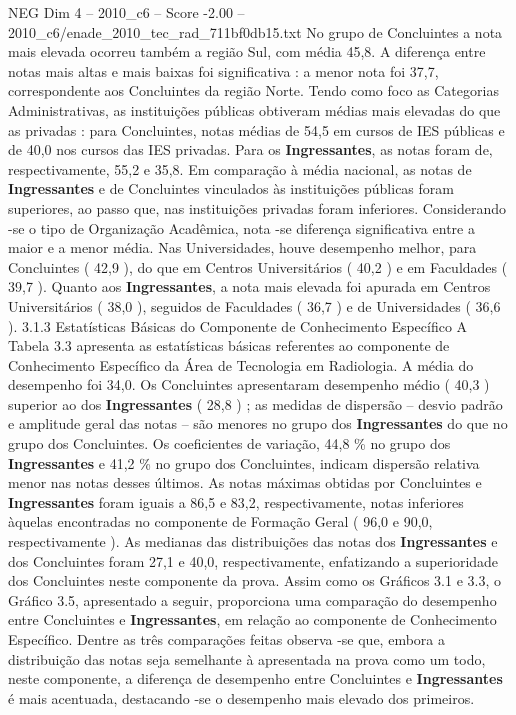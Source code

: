\begin{textsample}{NEG Dim 4 – 2010\_c6 – Score -2.00 – 2010\_c6/enade\_2010\_tec\_rad\_711bf0db15.txt}
No grupo de Concluintes a nota mais elevada ocorreu também a região Sul, com média 45,8.
A diferença entre notas mais altas e mais baixas foi significativa : a menor nota foi 37,7, correspondente aos Concluintes da região Norte.
Tendo como foco as Categorias Administrativas, as instituições públicas obtiveram médias mais elevadas do que as privadas : para Concluintes, notas médias de 54,5 em cursos de IES públicas e de 40,0 nos cursos das IES privadas.
Para os \textbf{Ingressantes}, as notas foram de, respectivamente, 55,2 e 35,8.
Em comparação à média nacional, as notas de \textbf{Ingressantes} e de Concluintes vinculados às instituições públicas foram superiores, ao passo que, nas instituições privadas foram inferiores.
Considerando -se o tipo de Organização Acadêmica, nota -se diferença significativa entre a maior e a menor média.
Nas Universidades, houve desempenho melhor, para Concluintes ( 42,9 ), do que em Centros Universitários ( 40,2 ) e em Faculdades ( 39,7 ).
Quanto aos \textbf{Ingressantes}, a nota mais elevada foi apurada em Centros Universitários ( 38,0 ), seguidos de Faculdades ( 36,7 ) e de Universidades ( 36,6 ). 3.1.3 Estatísticas Básicas do Componente de Conhecimento Específico A Tabela 3.3 apresenta as estatísticas básicas referentes ao componente de Conhecimento Específico da Área de Tecnologia em Radiologia.
A média do desempenho foi 34,0.
Os Concluintes apresentaram desempenho médio ( 40,3 ) superior ao dos \textbf{Ingressantes} ( 28,8 ) ; as medidas de dispersão – desvio padrão e amplitude geral das notas – são menores no grupo dos \textbf{Ingressantes} do que no grupo dos Concluintes.
Os coeficientes de variação, 44,8 \% no grupo dos \textbf{Ingressantes} e 41,2 \% no grupo dos Concluintes, indicam dispersão relativa menor nas notas desses últimos.
As notas máximas obtidas por Concluintes e \textbf{Ingressantes} foram iguais a 86,5 e 83,2, respectivamente, notas inferiores àquelas encontradas no componente de Formação Geral ( 96,0 e 90,0, respectivamente ).
As medianas das distribuições das notas dos \textbf{Ingressantes} e dos Concluintes foram 27,1 e 40,0, respectivamente, enfatizando a superioridade dos Concluintes neste componente da prova.
Assim como os Gráficos 3.1 e 3.3, o Gráfico 3.5, apresentado a seguir, proporciona uma comparação do desempenho entre Concluintes e \textbf{Ingressantes}, em relação ao componente de Conhecimento Específico.
Dentre as três comparações feitas observa -se que, embora a distribuição das notas seja semelhante à apresentada na prova como um todo, neste componente, a diferença de desempenho entre Concluintes e \textbf{Ingressantes} é mais acentuada, destacando -se o desempenho mais elevado dos primeiros.

\end{textsample}
